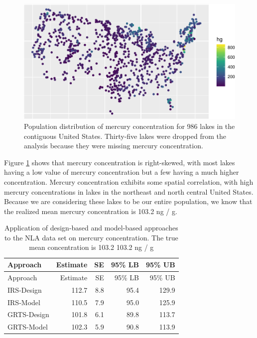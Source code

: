 \documentclass[]{elsarticle} %
\begin{document}
\begin{figure}
\includegraphics[width=1\linewidth]{SpatialDVM_Manuscript_files/figure-latex/figdata-1} \caption{Population distribution of mercury concentration for 986 lakes in the contiguous United States. Thirty-five lakes were dropped from the analysis because they were missing mercury concentration.}\label{fig:figdata}
\end{figure}

Figure \ref{fig:figdata} shows that mercury concentration is
right-skewed, with most lakes having a low value of mercury
concentration but a few having a much higher concentration. Mercury
concentration exhibits some spatial correlation, with high mercury
concentrations in lakes in the northeast and north central United
States. Because we are considering these lakes to be our entire
population, we know that the realized mean mercury concentration is
103.2 ng / g.

\begin{longtable}[]{@{}lrrrr@{}}
\caption{\label{tab:appliedtab} Application of design-based and
model-based approaches to the NLA data set on mercury concentration. The
true mean concentration is 103.2 103.2 ng / g}\tabularnewline
\toprule
Approach & Estimate & SE & 95\% LB & 95\% UB \\
\midrule
\endfirsthead
\toprule
Approach & Estimate & SE & 95\% LB & 95\% UB \\
\midrule
\endhead
IRS-Design & 112.7 & 8.8 & 95.4 & 129.9 \\
IRS-Model & 110.5 & 7.9 & 95.0 & 125.9 \\
GRTS-Design & 101.8 & 6.1 & 89.8 & 113.7 \\
GRTS-Model & 102.3 & 5.9 & 90.8 & 113.9 \\
\bottomrule
\end{longtable}
\end{document}
